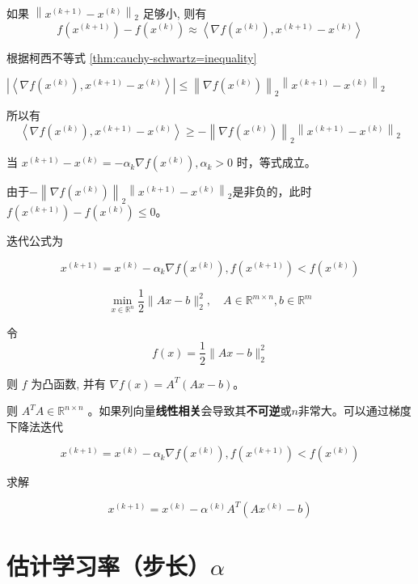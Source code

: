 如果 $ \left\|x^{(k+1)}-x^{(k)}\right\|_{2} $ 足够小, 则有
$$
f\left(x^{(k+1)}\right)-f\left(x^{(k)}\right) \approx\left\langle\nabla f\left(x^{(k)}\right), x^{(k+1)}-x^{(k)}\right\rangle
$$

\begin{corollary}
    根据柯西不等式 \ref{thm:cauchy-schwartz=inequality}

    $ \left|\left\langle\nabla f\left(x^{(k)}\right), x^{(k+1)}-x^{(k)}\right\rangle\right| \leq\left\|\nabla f\left(x^{(k)}\right)\right\|_{2}\left\|x^{(k+1)}-x^{(k)}\right\|_{2} $

    所以有
    $$
\left\langle\nabla f\left(x^{(k)}\right), x^{(k+1)}-x^{(k)}\right\rangle \geq -\left\|\nabla f\left(x^{(k)}\right)\right\|_{2}\left\|x^{(k+1)}-x^{(k)}\right\|_{2}
$$

当 $ x^{(k+1)}-x^{(k)}=-\alpha_{k} \nabla f\left(x^{(k)}\right), \alpha_{k}>0 $ 时，等式成立。

由于$-\left\|\nabla f\left(x^{(k)}\right)\right\|_{2}\left\|x^{(k+1)}-x^{(k)}\right\|_{2}$是非负的，此时$f\left(x^{(k+1)}\right)-f\left(x^{(k)}\right) \le 0$。
\end{corollary}

迭代公式为 

$$  x^{(k+1)}=x^{(k)}-\alpha_{k} \nabla f\left(x^{(k)}\right) , f\left(x^{(k+1)}\right)<f\left(x^{(k)}\right) $$


\begin{definition}[梯度下降法求解最小二乘法]
    $$
\min _{x \in \mathbb{R}^{n}} \frac{1}{2}\|A x-b\|_{2}^{2}, \quad A \in \mathbb{R}^{m \times n}, b \in \mathbb{R}^{m}
$$

令 $$ f(x)=\frac{1}{2}\|A x-b\|_{2}^{2} $$

则 $ f $ 为凸函数, 并有 $ \nabla f(x)=A^{T}(A x-b) $。

则 $ A^{T} A \in \mathbb{R}^{n \times n} $ 。如果列向量\textbf{线性相关}会导致其\textbf{不可逆}或$n$非常大。可以通过梯度下降法迭代

$$  x^{(k+1)}=x^{(k)}-\alpha_{k} \nabla f\left(x^{(k)}\right) , f\left(x^{(k+1)}\right)<f\left(x^{(k)}\right) $$

求解

$$ x^{(k+1)}=x^{(k)}-\alpha^{(k)} A^{T}\left(A x^{(k)}-b\right) $$
\end{definition}

\section{估计学习率（步长）$\alpha$}

